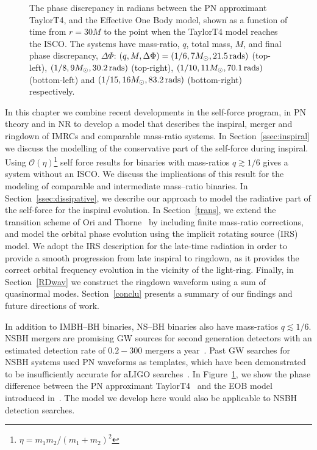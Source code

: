 \begin{figure}
{}
\caption{The phase discrepancy in radians between the PN approximant TaylorT4, and the Effective One Body model, shown as a function of time from \(r=30M\) to the point when the TaylorT4 model reaches the ISCO. The systems have mass-ratio, $q$, total mass, \(M\), and final phase discrepancy, $\Delta\Phi$: $(q, M, \Delta\Phi) = (1/6, 7M_{\odot},21.5\,{\rm rads})$ (top-left), $(1/8, 9M_{\odot},30.2\,{\rm rads})$ (top-right), $(1/10, 11M_{\odot},70.1\,{\rm rads})$ (bottom-left) and $(1/15, 16M_{\odot},83.2\,{\rm rads})$ (bottom-right) respectively.}
\label{pn_approx}
\end{figure}


In this chapter we combine recent developments in the self-force program, in 
PN theory and in NR to develop a model that describes the inspiral, merger and
ringdown of IMRCs and comparable mass-ratio systems. In Section~\ref{ssec:inspiral} 
we
discuss the modelling of the conservative part of the self-force during inspiral.
Using \(\mathcal{O}(\eta)\)\footnote{\(\eta=m_1 m_2/(m_1+m_2)^2\)} 
self force results for binaries with mass-ratios \(q\gtrsim1/6\) gives a 
system without an ISCO. We discuss the implications of this result for 
the modeling of comparable and intermediate mass--ratio binaries.  
% 
In Section~\ref{ssec:dissipative}, we describe our approach 
to model the radiative part of the self-force for the inspiral evolution. 
% 
In Section~\ref{trans}, we extend the transition scheme of 
Ori and Thorne~\cite{ori} by including finite mass-ratio corrections, and model
the orbital phase evolution using the implicit rotating source (IRS) model. 
We adopt the IRS description for the late-time radiation in order to provide a 
smooth progression from late inspiral to ringdown, as it provides the correct 
orbital frequency evolution in the vicinity of the light-ring. 
% 
Finally, in Section~\ref{RDwav} we construct the ringdown waveform using a 
sum of quasinormal modes. Section~\ref{conclu} presents a summary of our 
findings and future directions of work. 

In addition to IMBH--BH binaries, NS--BH binaries also have mass-ratios 
\(q \lesssim 1/6\). NSBH mergers are promising GW sources for second generation detectors
with an estimated detection rate of \(0.2-300\) mergers a year~\cite{LSCCBCRates2010}. 
Past GW searches for NSBH systems used PN waveforms as templates, which have
been demonstrated to be insufficiently accurate for aLIGO searches~\cite{Nitz:2013mxa}. 
In Figure~\ref{pn_approx}, we show the phase difference between the PN approximant TaylorT4~\cite{TaylorT4Origin} and the EOB model introduced
in~\cite{BuonannoEOBv2Main}. The model we develop here would 
also be applicable to NSBH detection searches.



